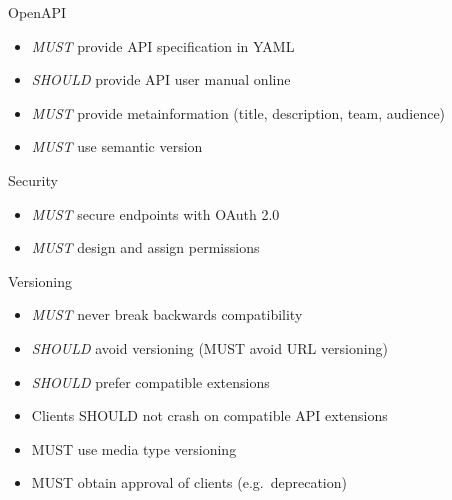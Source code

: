 \documentclass[10pt]{beamer}
\begin{document}
\begin{frame}{OpenAPI}

  \begin{itemize}

    \item
          \emph{MUST} provide API specification in YAML
    \item
          \emph{SHOULD} provide API user manual online
    \item
          \emph{MUST} provide metainformation (title, description, team, audience)
    \item
          \emph{MUST} use semantic version
  \end{itemize}

\end{frame}

\begin{frame}{Security}

  \begin{itemize}

    \item
          \emph{MUST} secure endpoints with OAuth 2.0
    \item
          \emph{MUST} design and assign permissions
  \end{itemize}

\end{frame}

\begin{frame}{Versioning}

  \begin{itemize}

    \item
          \emph{MUST} never break backwards compatibility
    \item
          \emph{SHOULD} avoid versioning (MUST avoid URL versioning)
    \item
          \emph{SHOULD} prefer compatible extensions
    \item
          Clients SHOULD not crash on compatible API extensions
    \item
          MUST use media type versioning
    \item
          MUST obtain approval of clients (e.g.~deprecation)
  \end{itemize}

\end{frame}
\end{document}
